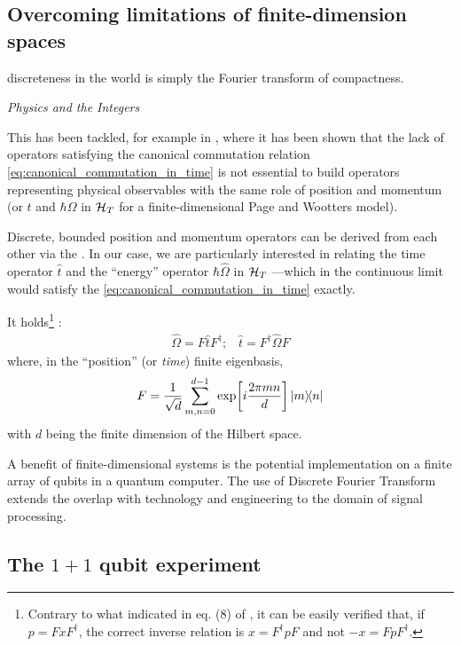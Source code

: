\subsection{Overcoming limitations of finite-dimension spaces}

\epigraph{\textelp{} discreteness in the world is simply the Fourier transform of compactness.}{
  \emph{Physics and the Integers} \parencite{Tong_Integers}
}

\noindent{}This has been tackled, for example in
\cite{FiniteHilb},
where it has been shown that the lack of operators satisfying the canonical
commutation relation \eqref{eq:canonical_commutation_in_time}
is not essential to build operators representing physical observables
with the same role of position and momentum (or $t$ and $\hbar\Omega$
in $\mathcal{H}_T$ for a finite-dimensional Page and Wootters model).

Discrete, bounded position and momentum operators can be derived from
each other via
the .
In our case, we are particularly interested in relating the
time operator $\hat{t}$ and the ``energy'' operator $\hbar\hat{\Omega}$
in $\mathcal{H}_T$ ---which in the continuous limit would satisfy the
\eqref{eq:canonical_commutation_in_time} exactly.

It holds\footnote{
  Contrary to what indicated in eq. (8) of \cite{FiniteHilb},
  it can be easily verified that,
  if $ p = F x F^{\dagger} $,
  the correct inverse relation is
  $ x = F^{\dagger} p F$ and not $ -x = F p F^{\dagger} $.
} \parencite{FiniteHilb}:
\begin{gather}
  \hat{\Omega} = F \hat{t} F^{\dagger}\text{;} \quad
  \hat{t} = F^{\dagger} \hat{\Omega} F
\end{gather}
where, in the ``position'' (or \emph{time}) finite eigenbasis,
\begin{equation}
  F = \frac{1}{\sqrt{d}} \sum_{m,n=0}^{d-1} \exp[i\frac{2\pi mn}{d}] \ketbra{m}{n}
\end{equation}
with $d$ being the finite dimension of the Hilbert space.

A benefit of finite-dimensional systems is the potential implementation on a finite array of
qubits in a quantum computer. The use of Discrete Fourier Transform extends the overlap
with technology and engineering to the domain of signal processing. \parencite{FiniteHilb}

\subsection{The $1 + 1$ qubit experiment \parencite{Moreva:synthetic, Moreva:illustration}}

